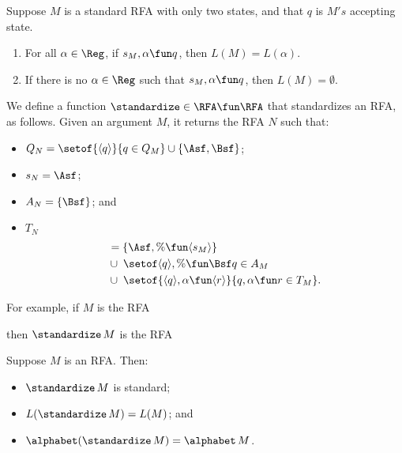 \begin{proposition}
Suppose $M$ is a standard RFA with only two states,
and that $q$ is $M's$ accepting state.
\begin{enumerate}[\quad(1)]
\item For all $\alpha\in\Reg$, if $s_M,\alpha\fun q$, then
  $L(M) = L(\alpha)$.

\item If there is no $\alpha\in\Reg$ such that $s_M,\alpha\fun q$,
  then $L(M) = \emptyset$.
\end{enumerate}
\end{proposition}

We define a function $\standardize\in\RFA\fun\RFA$ that standardizes
an RFA, as follows.  Given an argument $M$, it returns the RFA $N$
such that:
\begin{itemize}
\item $Q_N = \setof{\langle q\rangle}{q\in Q_M}\cup\{\Asf,\Bsf\}$;

\item $s_N = \Asf$;

\item $A_N = \{\Bsf\}$; and

\item $T_N$
  \begin{align*}
    &= \{\Asf,\%\fun\langle s_M\rangle\} \\
    &\cup \;\setof{\langle q\rangle,\%\fun\Bsf}{q\in A_M} \\
    &\cup \;\setof{\langle q\rangle,\alpha\fun\langle r\rangle}%
            {q,\alpha\fun r\in T_M}.
  \end{align*}
\end{itemize}

For example, if $M$ is the RFA
\begin{center}
  
\end{center}
then $\standardize\,M$ is the RFA
\begin{center}
  
\end{center}

\begin{proposition}
Suppose $M$ is an RFA.  Then:
\begin{itemize}
\item $\standardize\,M$ is standard;

\item $L(\standardize\,M) = L(M)$; and

\item $\alphabet(\standardize\,M) = \alphabet\,M$.
\end{itemize}
\end{proposition}

